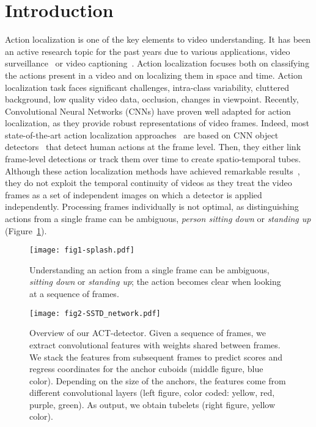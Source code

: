 \documentclass[10pt,twocolumn,letterpaper]{article}
\begin{document}
 \vspace{-3mm}
\section{Introduction}
\label{sec:intro}

Action localization is one of the key elements to video understanding. It has been an active research topic for the past years due to various applications, \eg video surveillance~\cite{hu2004survey,oh2011large} or video captioning~\cite{venugopalan2015sequence,yao15iccv}. Action localization focuses both on classifying the actions present in a video and on localizing them in space and time. Action localization task faces significant challenges, \eg intra-class variability, cluttered background, low quality video data, occlusion, changes in viewpoint. Recently, Convolutional Neural Networks (CNNs) have proven well adapted for action localization, as they provide robust representations of video frames. Indeed, most state-of-the-art action localization approaches~\cite{Gkioxari15cvpr,Peng16eccv,Suman16bmvc,singh16arxiv,Weinzaepfel15iccv} are based on CNN object detectors~\cite{liu16eccv,ren15nips} that detect human actions at the frame level. Then, they either link frame-level detections or track them over time to create spatio-temporal tubes. Although these action localization methods have achieved remarkable results~\cite{Peng16eccv,Suman16bmvc}, they do not exploit the temporal continuity of videos as they treat the video frames as a set of independent images on which a detector is applied independently. Processing frames individually is not optimal, as distinguishing actions from a single frame can be ambiguous, \eg \textit{person sitting down} or \textit{standing up} (Figure~\ref{fig:splash}).  

\begin{figure}[t]
\centering
\texttt{[image: fig1-splash.pdf]}
\vspace{-5mm}
\caption{Understanding an action from a single frame can be ambiguous, \eg \textit{sitting down} or \textit{standing up}; the action becomes clear when looking at a sequence of frames.}
\label{fig:splash}
\vspace{-6mm}
\end{figure}

\begin{figure*}[t!]
\centerline{
\texttt{[image: fig2-SSTD\_network.pdf]}}
\vspace{-1mm}
\caption{Overview of our ACT-detector. Given a sequence of frames, we extract convolutional features with weights shared between frames. We stack the features from subsequent frames to predict scores and regress coordinates for the anchor cuboids (middle figure, blue color). Depending on the size of the anchors, the features come from different convolutional layers (left figure, color coded: yellow, red, purple, green). As output, we obtain tubelets (right figure, yellow color).}
\label{fig:main}
\vspace{-5mm}
\end{figure*}
\end{document}
